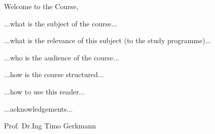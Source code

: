 
Welcome to the Course,

...what is the subject of the course...

...what is the relevance of this subject (to the study programme)...

...who is the audience of the course...

...how is the course structured...

...how to use this reader...

...acknowledgements...


\vspace{10mm}

\sffamily 
\begin{large}
\hspace{7cm}Prof. Dr.Ing Timo Gerkmann
\end{large}
\normalfont

